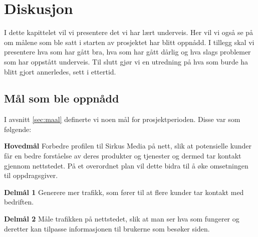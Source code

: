 \cleardoublepage
\chapter{Diskusjon}
\label{chap:discussion} 

I dette kapittelet vil vi presentere det vi har lært underveis. Her vil vi også se på om målene som ble satt i starten av prosjektet har blitt oppnådd. I tillegg skal vi presentere hva som har gått bra, hva som har gått dårlig og hva slags problemer som har oppstått underveis. Til slutt gjør vi en utredning på hva som burde ha blitt gjort annerledes, sett i ettertid.

\section{Mål som ble oppnådd}
I avsnitt \ref{sec:maal} definerte vi noen mål for prosjektperioden. Disse var som følgende:

\begin{compactitem}
\item [{\bf Hovedmål}] Forbedre profilen til Sirkus Media på nett, slik at potensielle kunder får en bedre forståelse av deres produkter og tjenester og dermed tar kontakt gjennom nettstedet. På et overordnet plan vil dette bidra til å øke omsetningen til oppdragsgiver.
\begin{compactitem}
\item [{\bf  Delmål 1} ] Generere mer trafikk, som fører til at flere kunder tar kontakt med bedriften. 
\item [{\bf  Delmål 2} ] Måle trafikken på nettstedet, slik at man ser hva som fungerer og deretter kan tilpasse informasjonen til brukerne som besøker siden.
\end{compactitem}
\end{compactitem}

